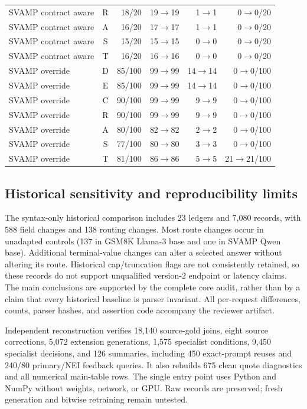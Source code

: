 \documentclass[journal,onecolumn]{IEEEtran}
\begin{document}
\begin{longtable}{@{}L{4.1cm}crrrr@{}}
SVAMP contract aware & R & 18/20 & 19$\to$19 & 1$\to$1 & 0$\to$0/20\\
SVAMP contract aware & A & 16/20 & 17$\to$17 & 1$\to$1 & 0$\to$0/20\\
SVAMP contract aware & S & 15/20 & 15$\to$15 & 0$\to$0 & 0$\to$0/20\\
SVAMP contract aware & T & 16/20 & 16$\to$16 & 0$\to$0 & 0$\to$0/20\\
SVAMP override & D & 85/100 & 99$\to$99 & 14$\to$14 & 0$\to$0/100\\
SVAMP override & E & 85/100 & 99$\to$99 & 14$\to$14 & 0$\to$0/100\\
SVAMP override & C & 90/100 & 99$\to$99 & 9$\to$9 & 0$\to$0/100\\
SVAMP override & R & 90/100 & 99$\to$99 & 9$\to$9 & 0$\to$0/100\\
SVAMP override & A & 80/100 & 82$\to$82 & 2$\to$2 & 0$\to$0/100\\
SVAMP override & S & 77/100 & 80$\to$80 & 3$\to$3 & 0$\to$0/100\\
SVAMP override & T & 81/100 & 86$\to$86 & 5$\to$5 & 21$\to$21/100\\
\bottomrule
\end{longtable}
\endgroup

\subsection{Historical sensitivity and reproducibility limits}
The syntax-only historical comparison includes 23 ledgers and 7,080 records, with 588 field changes and 138 routing changes. Most route changes occur in unadapted controls (137 in GSM8K Llama-3 base and one in SVAMP Qwen base). Additional terminal-value changes can alter a selected answer without altering its route. Historical cap/truncation flags are not consistently retained, so these records do not support unqualified version-2 endpoint or latency claims. The main conclusions are supported by the complete core audit, rather than by a claim that every historical baseline is parser invariant. All per-request differences, counts, parser hashes, and assertion code accompany the reviewer artifact.

Independent reconstruction verifies 18,140 source-gold joins, eight source corrections, 5,072 extension generations, 1,575 specialist conditions, 9,450 specialist decisions, and 126 summaries, including 450 exact-prompt reuses and 240/80 primary/NEI feedback queries. It also rebuilds 675 clean quote diagnostics and all numerical main-table rows. The single entry point  uses Python and NumPy without weights, network, or GPU. Raw records are preserved; fresh generation and bitwise retraining remain untested.
\end{document}
